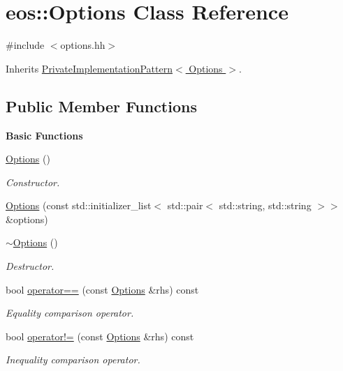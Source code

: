 \hypertarget{classeos_1_1Options}{
\section{eos::Options Class Reference}
\label{classeos_1_1Options}
}


{\ttfamily \#include $<$options.hh$>$}

Inherits \hyperlink{classeos_1_1PrivateImplementationPattern}{PrivateImplementationPattern$<$ Options $>$}.\subsection*{Public Member Functions}
\begin{Indent}{\bf Basic Functions}\par
{\em \label{_amgrp2386c9a1f1785edee33f374dd2db9b3d}
 }\begin{DoxyCompactItemize}
\item 
\hyperlink{classeos_1_1Options_a41872695828e800ea0d439ded2e79ccc}{Options} ()
\begin{DoxyCompactList}\small\item\em Constructor. \item\end{DoxyCompactList}\item 
\hyperlink{classeos_1_1Options_a618567d9edd73c4695ff8913a18f7eb4}{Options} (const std::initializer\_\-list$<$ std::pair$<$ std::string, std::string $>$$>$ \&options)
\item 
\hyperlink{classeos_1_1Options_a8509f24945b363809455ae0b56046324}{$\sim$Options} ()
\begin{DoxyCompactList}\small\item\em Destructor. \item\end{DoxyCompactList}\item 
bool \hyperlink{classeos_1_1Options_aa5defab8e8ba2e07871b20374c3f2db2}{operator==} (const \hyperlink{classeos_1_1Options}{Options} \&rhs) const 
\begin{DoxyCompactList}\small\item\em Equality comparison operator. \item\end{DoxyCompactList}\item 
bool \hyperlink{classeos_1_1Options_aaf02fdcc1fb86da35155d85e8f3982c5}{operator!=} (const \hyperlink{classeos_1_1Options}{Options} \&rhs) const 
\begin{DoxyCompactList}\small\item\em Inequality comparison operator. \item\end{DoxyCompactList}\end{DoxyCompactItemize}
\end{Indent}
